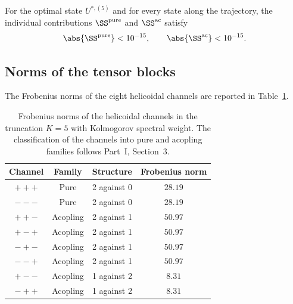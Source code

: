 \begin{proposition}\label{part-5:prop:decoupling-verify}
For the optimal state $U^{\ast,(5)}$ and for every state along the 
trajectory, the individual contributions $\SS^{\mathrm{pure}}$ and 
$\SS^{\mathrm{ac}}$ satisfy
\begin{equation}\label{part-5:eq:decoupling-numeric}
\abs{\SS^{\mathrm{pure}}} < 10^{-15},
\qquad
\abs{\SS^{\mathrm{ac}}} < 10^{-15}.
\end{equation}
\end{proposition}

\subsection{Norms of the tensor blocks}
\label{part-5:ssec:tensor-norms}

The Frobenius norms of the eight helicoidal channels are reported in 
Table~\ref{part-5:tab:channel-norms-V}.

\begin{table}[h]
\centering
\caption{Frobenius norms of the helicoidal channels in the 
truncation $K=5$ with Kolmogorov spectral weight. The classification 
of the channels into pure and acopling families follows Part~I, 
Section~3.}
\label{part-5:tab:channel-norms-V}
\begin{tabular}{cccc}
\toprule
Channel & Family & Structure & Frobenius norm \\
\midrule
$+++$ & Pure & 2 against 0 & $28.19$ \\
$---$ & Pure & 2 against 0 & $28.19$ \\
$++-$ & Acopling & 2 against 1 & $50.97$ \\
$+-+$ & Acopling & 2 against 1 & $50.97$ \\
$-+-$ & Acopling & 2 against 1 & $50.97$ \\
$--+$ & Acopling & 2 against 1 & $50.97$ \\
$+--$ & Acopling & 1 against 2 & $8.31$ \\
$-++$ & Acopling & 1 against 2 & $8.31$ \\
\bottomrule
\end{tabular}
\end{table}

